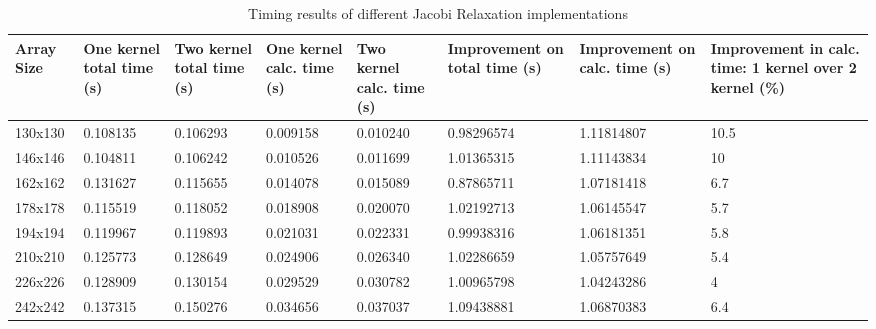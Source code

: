 \documentclass[10pt]{article}
\begin{document}
\begin{multicols}{2}
    \begin{center}
    \begin{table*}[ht]\footnotesize
        \begin{tabular}{ | p{1.3cm} | p{1.5cm} | p{1.5cm} | p{1.6cm} | p{1.6cm} | p{2cm} | p{1.9cm} | p{2cm} | }
            \hline
            Array Size  & One kernel total time (s) & Two kernel total time (s) & One kernel calc. time (s) & Two kernel calc. time (s) & Improvement on total time (s) & Improvement on calc. time (s) & Improvement in calc. time: 1 kernel over 2 kernel (\%) \\ \hline
            130x130 & 0.108135    & 0.106293    & 0.009158    & 0.010240    & 0.98296574  & 1.11814807  & 10.5  \\
            146x146 & 0.104811    & 0.106242    & 0.010526    & 0.011699    & 1.01365315  & 1.11143834  & 10    \\
            162x162 & 0.131627    & 0.115655    & 0.014078    & 0.015089    & 0.87865711  & 1.07181418  & 6.7   \\
            178x178 & 0.115519    & 0.118052    & 0.018908    & 0.020070    & 1.02192713  & 1.06145547  & 5.7   \\
            194x194 & 0.119967    & 0.119893    & 0.021031    & 0.022331    & 0.99938316  & 1.06181351  & 5.8   \\
            210x210 & 0.125773    & 0.128649    & 0.024906    & 0.026340    & 1.02286659  & 1.05757649  & 5.4   \\
            226x226 & 0.128909    & 0.130154    & 0.029529    & 0.030782    & 1.00965798  & 1.04243286  & 4     \\
            242x242 & 0.137315    & 0.150276    & 0.034656    & 0.037037    & 1.09438881  & 1.06870383  & 6.4   \\
            \hline
        \end{tabular}
        \caption{Timing results of different Jacobi Relaxation implementations}
        \label{tab:timing}
        \end{table*}
    \end{center}


\end{multicols}
\end{document}
